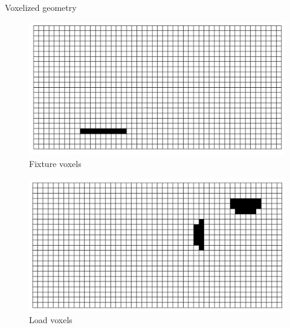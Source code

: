 \begin{frame}{Voxelized geometry}
\hfill
\begin{minipage}{0.49\textwidth}
\begin{figure}
\includegraphics[width=.8\textwidth]{Pictures/Voxels/Fixture.png}
\caption{Fixture voxels}
\end{figure}
\vspace{-0.6cm}
\begin{figure}
\includegraphics[width=.8\textwidth]{Pictures/Voxels/Load.png}
\caption{Load voxels}
\end{figure}
\end{minipage}
\end{frame}

